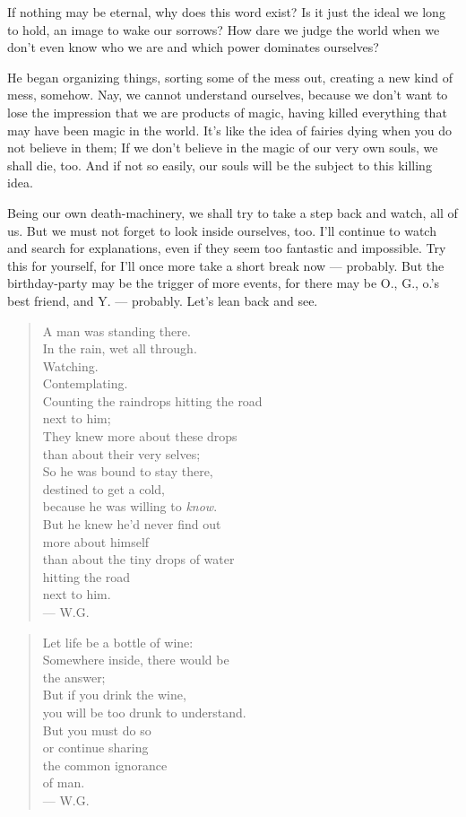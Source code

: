If nothing may be eternal, why does this word exist? Is it just the ideal we long to hold, an image to wake our sorrows? 
How dare we judge the world when we don't even know who we are and which power dominates ourselves?

He began organizing things, sorting some of the mess out, creating a new kind of mess, somehow. Nay, we cannot understand ourselves, because we don't want to lose the impression that we are products of magic, having killed everything that may have been magic in the world. It's like the idea of fairies dying when you do not believe in them; If we don't believe in the magic of our very own souls, we shall die, too. 
And if not so easily, our souls will be the subject to this killing idea.

Being our own death-machinery, we shall try to take a step back and watch, all of us. But we must not forget to look inside ourselves, too. 
I'll continue to watch and search for explanations, even if they seem too fantastic and impossible. Try this for yourself, for I'll once more take a short break now --- probably. But the birthday-party may be the trigger of more events, for there may be O., G., o.'s best friend, and Y. --- probably. Let's lean back and see.

\begin{verse}
A man was standing there. \\
In the rain, wet all through. \\
Watching. \\
Contemplating. \\
Counting the raindrops hitting the road \\
next to him; \\
They knew more about these drops \\
than about their very selves; \\
So he was bound to stay there, \\
destined to get a cold, \\
because he was willing to \emph{know}. \\
But he knew he'd never find out \\
more about himself \\
than about the tiny drops of water \\
hitting the road \\
next to him. \\
--- W.G.
\end{verse}

\begin{verse}
Let life be a bottle of wine: \\
Somewhere inside, there would be \\
the answer; \\
But if you drink the wine, \\
you will be too drunk to understand. \\
But you must do so \\
or continue sharing \\
the common ignorance \\
of man. \\
--- W.G.
\end{verse}

